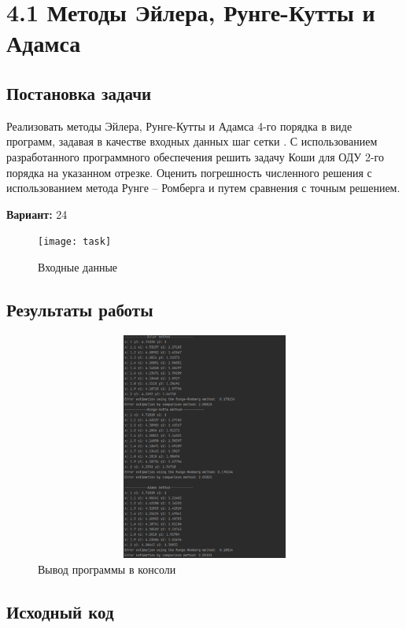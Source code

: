 \section* {4.1 Методы Эйлера, Рунге-Кутты и Адамса}

\subsection{Постановка задачи}
Реализовать методы Эйлера, Рунге-Кутты и Адамса 4-го порядка в виде программ, задавая в качестве входных данных шаг сетки  . С использованием разработанного программного обеспечения решить задачу Коши для ОДУ 2-го порядка на указанном отрезке. Оценить погрешность численного решения с использованием метода Рунге – Ромберга и путем сравнения с точным решением. 

{\bfseries Вариант:} 24

\begin{figure}[h!]
\centering
\texttt{[image: task]}
\caption{Входные данные}
\end{figure}

\subsection{Результаты работы}
\begin{figure}[h!]
\centering
\includegraphics[width=15cm, height=7.5cm]{img/lab4_1_res.png}
\caption{Вывод программы в консоли}
\end{figure}

\pagebreak

\subsection{Исходный код}












